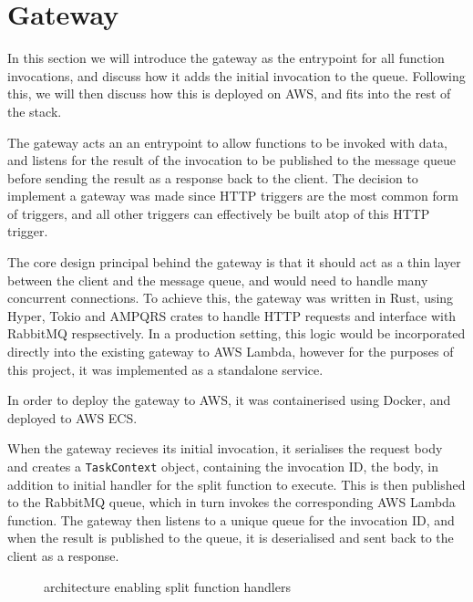 \section{Gateway}
In this section we will introduce the gateway as the entrypoint for all function invocations, and discuss how it adds the initial invocation to the queue. Following this, we will then discuss how this is deployed on AWS, and fits into the rest of the stack.

The gateway acts an an entrypoint to allow functions to be invoked with data, and listens for the result of the invocation to be published to the message queue before sending the result as a response back to the client. The decision to implement a gateway was made since HTTP triggers are the most common form of triggers\cite{eismannReviewServerlessUse2020}, and all other triggers can effectively be built atop of this HTTP trigger.

The core design principal behind the gateway is that it should act as a thin layer between the client and the message queue, and would need to handle many concurrent connections. To achieve this, the gateway was written in Rust, using Hyper, Tokio and AMPQRS crates to handle HTTP requests and interface with RabbitMQ respsectively. In a production setting, this logic would be incorporated directly into the existing gateway to AWS Lambda, however for the purposes of this project, it was implemented as a standalone service.

In order to deploy the gateway to AWS, it was containerised using Docker, and deployed to AWS ECS.

When the gateway recieves its initial invocation, it serialises the request body and creates a \verb|TaskContext| object, containing the invocation ID, the body, in addition to initial handler for the split function to execute. This is then published to the RabbitMQ queue, which in turn invokes the corresponding AWS Lambda function. The gateway then listens to a unique queue for the invocation ID, and when the result is published to the queue, it is deserialised and sent back to the client as a response.

\begin{figure}[htp]
    \centering
    \quad
    \caption{\faas{} architecture enabling split function handlers}
\end{figure}

